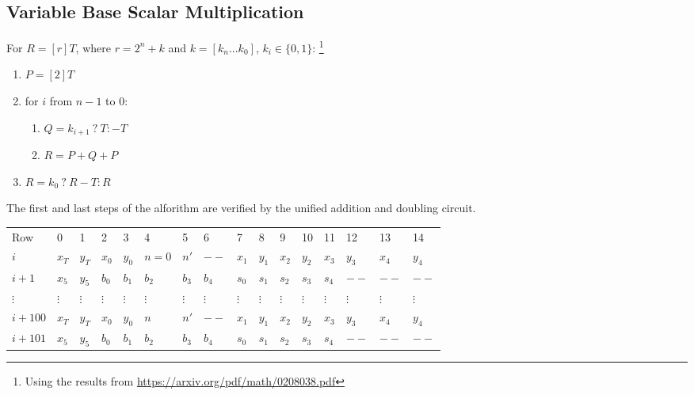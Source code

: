 \subsection{Variable Base Scalar Multiplication}
For $R  = [r]T$, where $r = 2^n + k$ and $k = [k_n ... k_0]$, $k_i \in \{0, 1\}$:
\footnote{Using the results from \url{https://arxiv.org/pdf/math/0208038.pdf}}
\begin{enumerate}
    \item $P = [2]T$
    \item for $i$ from $n - 1$ to $0$:
    \begin{enumerate}
        \item $Q = k_{i + 1} \: ? \: T : -T$
        \item $R = P + Q + P$
    \end{enumerate}
    \item $R = k_0 \: ? \: R - T : R$
\end{enumerate}

The first and last steps of the alforithm are verified by the unified addition and doubling circuit. 

\begin{center}
    \begin{table}[H]
        \begin{tabular}{llllllllllllllll}
            Row     & 0        & 1        & 2        & 3        & 4        & 5        & 6        & 7        & 8        & 9        & 10       & 11       & 12       & 13       & 14       \\
            $i$    & $x_T$    & $y_T$    & $x_0$    & $y_0$    & $n = 0$    & $n'$    & $--$    & $x_1$    & $y_1$    & $x_2$    & $y_2$    & $x_3$    & $y_3$ & $x_4$ & $y_4$ \\
            $i + 1$   & $x_5$    & $y_5$    & $b_0$    & $b_1$    & $b_2$    & $b_3$    & $b_4$      & $s_0$    & $s_1$    & $s_2$    & $s_3$    & $s_4$    & $--$ & $--$ & $--$ \\
            $\vdots$  & $\vdots$ & $\vdots$ & $\vdots$ & $\vdots$ & $\vdots$ & $\vdots$ & $\vdots$ & $\vdots$ & $\vdots$ & $\vdots$ & $\vdots$ & $\vdots$ & $\vdots$ & $\vdots$ & $\vdots$ \\
            $i + 100$ & $x_T$    & $y_T$    & $x_0$    & $y_0$    & $n$    & $n'$    & $--$    & $x_1$    & $y_1$    & $x_2$    & $y_2$    & $x_3$    & $y_3$ & $x_4$ & $y_4$ \\
            $i + 101$ & $x_5$    & $y_5$    & $b_0$    & $b_1$    & $b_2$    & $b_3$    & $b_4$      & $s_0$    & $s_1$    & $s_2$    & $s_3$    & $s_4$    & $--$ & $--$ & $--$ \\
        \end{tabular}
    \end{table}
\end{center}

